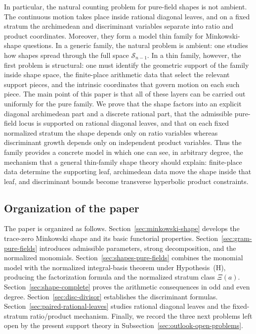 \documentclass[11pt,letterpaper]{amsart}
\theoremstyle{plain}
\theoremstyle{definition}
\begin{document}
In particular, the natural counting problem for pure-field shapes is not
ambient.  The continuous motion takes place inside rational diagonal leaves, and
on a fixed stratum the archimedean and discriminant variables separate into
ratio and product coordinates. Moreover, they form a model thin family for Minkowski-shape questions.  In a
generic family, the natural problem is ambient: one studies how shapes spread
through the full space \(\mathscr S_{n-1}\).  In a thin family, however, the
first problem is structural: one must identify the geometric support of the
family inside shape space, the finite-place arithmetic data that select the
relevant support pieces, and the intrinsic coordinates that govern motion on
each such piece.  The main point of this paper is that all of these layers can
be carried out uniformly for the pure family.
We prove that the shape factors into an explicit diagonal archimedean part and
a discrete rational part, that the admissible pure-field locus is supported on
rational diagonal leaves, and that on each fixed normalized stratum the shape
depends only on ratio variables whereas discriminant growth depends only on
independent product variables.  Thus the family provides a concrete model
in which one can see, in arbitrary degree, the mechanism that a general
thin-family shape theory should explain: finite-place data determine the
supporting leaf, archimedean data move the shape inside that leaf, and
discriminant bounds become transverse hyperbolic product constraints.

\subsection*{Organization of the paper}

The paper is organized as follows.
Section~\ref{sec:minkowski-shape} develops the trace-zero Minkowski shape and
its basic functorial properties.
Section~\ref{sec:gram-pure-fields} introduces admissible parameters, strong
decomposition, and the normalized monomials.
Section~\ref{sec:shapes-pure-fields} combines the monomial model with the
normalized integral-basis theorem under Hypothesis~\textup{(H)}, producing the
factorization formula and the normalized stratum class \(\Xi(a)\).
Section~\ref{sec:shape-complete} proves the arithmetic consequences in odd and
even degree.
Section~\ref{sec:disc-divisor} establishes the discriminant formulas.
Section~\ref{sec:paired-rational-leaves} studies rational diagonal leaves and
the fixed-stratum ratio/product mechanism. Finally, we record the three next problems left open by the present support theory in Subsection~\ref{sec:outlook-open-problems}.
\end{document}
